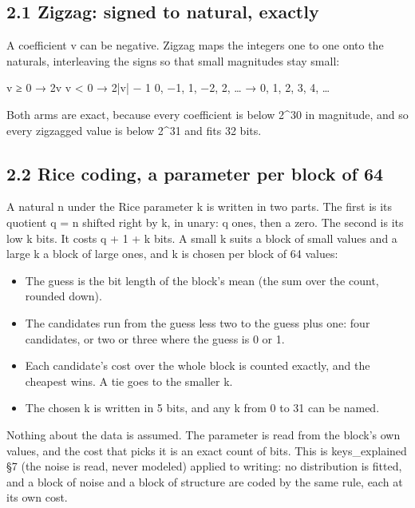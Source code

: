 \subsection{\texorpdfstring{2.1 Zigzag: signed to natural, exactly}{2.1 Zigzag: signed to natural, exactly}}

A coefficient v can be negative. Zigzag maps the integers one to one onto the naturals, interleaving the signs so that small magnitudes stay small:

v ≥ 0  →  2v          v < 0  →  2|v| − 1 0, −1, 1, −2, 2, …  →  0, 1, 2, 3, 4, …

Both arms are exact, because every coefficient is below 2\textasciicircum{}30 in magnitude, and so every zigzagged value is below 2\textasciicircum{}31 and fits 32 bits.

\subsection{\texorpdfstring{2.2 Rice coding, a parameter per block of 64}{2.2 Rice coding, a parameter per block of 64}}

A natural n under the Rice parameter k is written in two parts. The first is its quotient q = n shifted right by k, in unary: q ones, then a zero. The second is its low k bits. It costs q + 1 + k bits. A small k suits a block of small values and a large k a block of large ones, and k is chosen per block of 64 values:

\begin{itemize}
\item The guess is the bit length of the block's mean (the sum over the count, rounded down).
\item The candidates run from the guess less two to the guess plus one: four candidates, or two or three where the guess is 0 or 1.
\item Each candidate's cost over the whole block is counted exactly, and the cheapest wins. A tie goes to the smaller k.
\item The chosen k is written in 5 bits, and any k from 0 to 31 can be named.
\end{itemize}

Nothing about the data is assumed. The parameter is read from the block's own values, and the cost that picks it is an exact count of bits. This is keys\_\allowbreak{}explained §7 (the noise is read, never modeled) applied to writing: no distribution is fitted, and a block of noise and a block of structure are coded by the same rule, each at its own cost.

